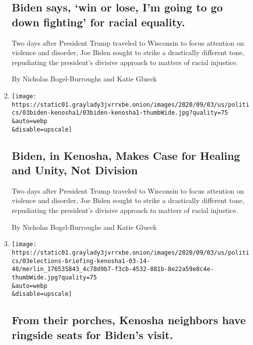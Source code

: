 \begin{enumerate}
  \hypertarget{biden-says-win-or-lose-im-going-to-go-down-fighting-for-racial-equality}{%
  \subsection{Biden says, `win or lose, I'm going to go down fighting'
  for racial
  equality.}\label{biden-says-win-or-lose-im-going-to-go-down-fighting-for-racial-equality}}

  Two days after President Trump traveled to Wisconsin to focus
  attention on violence and disorder, Joe Biden sought to strike a
  drastically different tone, repudiating the president's divisive
  approach to matters of racial injustice.

  By Nicholas Bogel-Burroughs and Katie Glueck
\item
  \href{/2020/09/03/us/politics/joe-biden-kenosha.html}{}

  \texttt{[image: https://static01.graylady3jvrrxbe.onion/images/2020/09/03/us/politics/03biden-kenosha1/03biden-kenosha1-thumbWide.jpg?quality=75\\\&auto=webp\\\&disable=upscale]}

  \hypertarget{biden-in-kenosha-makes-case-for-healing-and-unity-not-division}{%
  \subsection{Biden, in Kenosha, Makes Case for Healing and Unity, Not
  Division}\label{biden-in-kenosha-makes-case-for-healing-and-unity-not-division}}

  Two days after President Trump traveled to Wisconsin to focus
  attention on violence and disorder, Joe Biden sought to strike a
  drastically different tone, repudiating the president's divisive
  approach to matters of racial injustice.

  By Nicholas Bogel-Burroughs and Katie Glueck
\item
  \href{/live/2020/09/03/us/trump-vs-biden/from-their-porches-kenosha-neighbors-have-ringside-seats-for-bidens-visit}{}

  \texttt{[image: https://static01.graylady3jvrrxbe.onion/images/2020/09/03/us/politics/03elections-briefing-kenosha1-03-14-48/merlin\_176535843\_4c78d9b7-f3cb-4532-881b-8e22a59e8c4e-thumbWide.jpg?quality=75\\\&auto=webp\\\&disable=upscale]}

  \hypertarget{from-their-porches-kenosha-neighbors-have-ringside-seats-for-bidens-visit}{%
  \subsection{From their porches, Kenosha neighbors have ringside seats
  for Biden's
  visit.}\label{from-their-porches-kenosha-neighbors-have-ringside-seats-for-bidens-visit}}


\end{enumerate}
